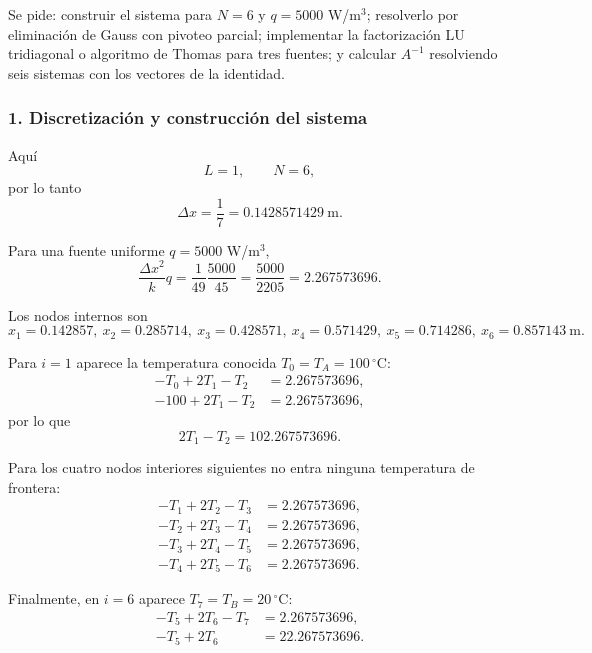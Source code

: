 \documentclass[11pt,a4paper]{article}
\begin{document}
Se pide: construir el sistema para $N=6$ y $q=5000$ W/m$^3$; resolverlo por eliminación de Gauss con pivoteo parcial; implementar la factorización LU tridiagonal o algoritmo de Thomas para tres fuentes; y calcular $A^{-1}$ resolviendo seis sistemas con los vectores de la identidad.

\subsubsection*{1. Discretización y construcción del sistema}

Aquí
\[
L=1,\qquad N=6,
\]
por lo tanto
\begin{equation}
\Delta x=\frac{1}{7}=0.1428571429\ \mathrm m.
\end{equation}

Para una fuente uniforme $q=5000$ W/m$^3$,
\begin{equation}
\frac{\Delta x^2}{k}q
=\frac{1}{49}\frac{5000}{45}
=\frac{5000}{2205}
=2.267573696.
\end{equation}

Los nodos internos son
\[
x_1=0.142857,
\ x_2=0.285714,
\ x_3=0.428571,
\ x_4=0.571429,
\ x_5=0.714286,
\ x_6=0.857143\ \mathrm m.
\]

Para $i=1$ aparece la temperatura conocida $T_0=T_A=100\,^{\circ}$C:
\begin{align}
-T_0+2T_1-T_2&=2.267573696,\\
-100+2T_1-T_2&=2.267573696,
\end{align}
por lo que
\[
2T_1-T_2=102.267573696.
\]

Para los cuatro nodos interiores siguientes no entra ninguna temperatura de frontera:
\begin{align}
-T_1+2T_2-T_3&=2.267573696,\\
-T_2+2T_3-T_4&=2.267573696,\\
-T_3+2T_4-T_5&=2.267573696,\\
-T_4+2T_5-T_6&=2.267573696.
\end{align}

Finalmente, en $i=6$ aparece $T_7=T_B=20\,^{\circ}$C:
\begin{align}
-T_5+2T_6-T_7&=2.267573696,\\
-T_5+2T_6&=22.267573696.
\end{align}
\end{document}
